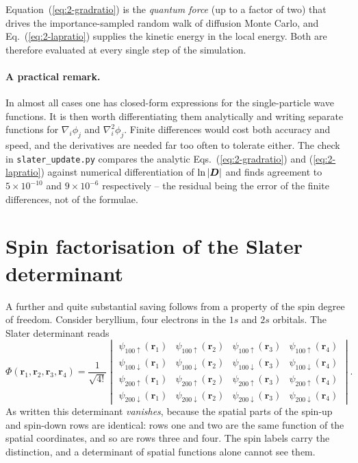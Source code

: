 Equation~(\ref{eq:2-gradratio}) is the \emph{quantum force} (up to a factor of
two) that drives the importance-sampled random walk of diffusion Monte Carlo,
and Eq.~(\ref{eq:2-lapratio}) supplies the kinetic energy in the local energy.
Both are therefore evaluated at every single step of the simulation.

\paragraph{A practical remark.}
In almost all cases one has closed-form expressions for the single-particle
wave functions.  It is then worth differentiating them analytically and
writing separate functions for $\nabla_i\phi_j$ and $\nabla_i^2\phi_j$.
Finite differences would cost both accuracy and speed, and the derivatives are
needed far too often to tolerate either.  The check in
\texttt{slater\_update.py} compares the analytic
Eqs.~(\ref{eq:2-gradratio}) and (\ref{eq:2-lapratio}) against numerical
differentiation of $\ln{|\boldsymbol{D}|}$ and finds agreement to $5\times10^{-10}$ and
$9\times10^{-6}$ respectively -- the residual being the error of the finite
differences, not of the formulae.

\section{Spin factorisation of the Slater determinant}
\label{sec:spinfactorisation}

A further and quite substantial saving follows from a property of the spin
degree of freedom.  Consider beryllium, four electrons in the $1s$ and $2s$
orbitals.  The Slater determinant reads
\begin{equation}
  \Phi(\bm{r}_1,\bm{r}_2,\bm{r}_3,\bm{r}_4)=\frac{1}{\sqrt{4!}}
  \begin{vmatrix}
    \psi_{100\uparrow}(\bm{r}_1)  & \psi_{100\uparrow}(\bm{r}_2)  &
    \psi_{100\uparrow}(\bm{r}_3)  & \psi_{100\uparrow}(\bm{r}_4)\\
    \psi_{100\downarrow}(\bm{r}_1)& \psi_{100\downarrow}(\bm{r}_2)&
    \psi_{100\downarrow}(\bm{r}_3)& \psi_{100\downarrow}(\bm{r}_4)\\
    \psi_{200\uparrow}(\bm{r}_1)  & \psi_{200\uparrow}(\bm{r}_2)  &
    \psi_{200\uparrow}(\bm{r}_3)  & \psi_{200\uparrow}(\bm{r}_4)\\
    \psi_{200\downarrow}(\bm{r}_1)& \psi_{200\downarrow}(\bm{r}_2)&
    \psi_{200\downarrow}(\bm{r}_3)& \psi_{200\downarrow}(\bm{r}_4)
  \end{vmatrix} .
  \label{eq:2-berylliumdet}
\end{equation}
As written this determinant \emph{vanishes}, because the spatial parts of the
spin-up and spin-down rows are identical: rows one and two are the same
function of the spatial coordinates, and so are rows three and four.  The spin
labels carry the distinction, and a determinant of spatial functions alone
cannot see them.

